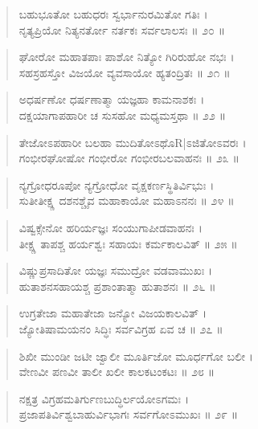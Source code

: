 \begin{verse}
ಬಹುಭೂತೋ ಬಹುಧರಃ ಸ್ವರ್ಭಾನುರಮಿತೋ ಗತಿಃ ।\\ನೃತ್ಯಪ್ರಿಯೋ ನಿತ್ಯನರ್ತೋ ನರ್ತಕಃ ಸರ್ವಲಾಲಸಃ \num{॥ ೨೦ ॥}
\end{verse}

\begin{verse}
ಘೋರೋ ಮಹಾತಪಾಃ ಪಾಶೋ ನಿತ್ಯೋ ಗಿರಿರುಹೋ ನಭಃ ।\\ಸಹಸ್ರಹಸ್ತೋ ವಿಜಯೋ ವ್ಯವಸಾಯೋ ಹ್ಯತಂದ್ರಿತಃ \num{॥ ೨೧ ॥}
\end{verse}

\begin{verse}
ಅಧರ್ಷಣೋ ಧರ್ಷಣಾತ್ಮಾ ಯಜ್ಞಹಾ ಕಾಮನಾಶಕಃ ।\\ದಕ್ಷಯಾಗಾಪಹಾರೀ ಚ ಸುಸಹೋ ಮಧ್ಯಮಸ್ತಥಾ \num{॥ ೨೨ ॥}
\end{verse}

\begin{verse}
ತೇಜೋಽಪಹಾರೀ ಬಲಹಾ ಮುದಿತೋಽಥೊR|ಽಜಿತೋಽವರಃ ।\\ಗಂಭೀರಘೋಷೋ ಗಂಭೀರೋ ಗಂಭೀರಬಲವಾಹನಃ \num{॥ ೨೩ ॥}
\end{verse}

\begin{verse}
ನ್ಯಗ್ರೋಧರೂಪೋ ನ್ಯಗ್ರೋಧೋ ವೃಕ್ಷಕರ್ಣಸ್ಥಿತಿರ್ವಿಭುಃ ।\\ಸುತೀತೀಕ್ಷ್ಣ ದಶನಶ್ಚೈವ ಮಹಾಕಾಯೋ ಮಹಾಽನನಃ \num{॥ ೨೪ ॥}
\end{verse}

\begin{verse}
ವಿಷ್ವಕ್ಸೇನೋ ಹರಿರ್ಯಜ್ಞಃ ಸಂಯುಗಾಪೀಡವಾಹನಃ ।\\ತೀಕ್ಷ್ಣ ತಾಪಶ್ಚ ಹರ್ಯಶ್ವಃ ಸಹಾಯಃ ಕರ್ಮಕಾಲವಿತ್ \num{॥ ೨೫ ॥}
\end{verse}

\begin{verse}
ವಿಷ್ಣುಪ್ರಸಾದಿತೋ ಯಜ್ಞಃ ಸಮುದ್ರೋ ವಡವಾಮುಖಃ ।\\ಹುತಾಶನಸಹಾಯಶ್ಚ ಪ್ರಶಾಂತಾತ್ಮಾ ಹುತಾಶನಃ \num{॥ ೨೬ ॥}
\end{verse}

\begin{verse}
ಉಗ್ರತೇಜಾ ಮಹಾತೇಜಾ ಜನ್ಯೋ ವಿಜಯಕಾಲವಿತ್ ।\\ಜ್ಯೋತಿಷಾಮಯನಂ ಸಿದ್ಧಿಃ ಸರ್ವವಿಗ್ರಹ ಏವ ಚ \num{॥ ೨೭ ॥}
\end{verse}

\begin{verse}
ಶಿಖೀ ಮುಂಡೀ ಜಟೀ ಜ್ವಾಲೀ ಮೂರ್ತಿಜೋ ಮೂರ್ಧಗೋ ಬಲೀ ।\\ವೇಣವೀ ಪಣವೀ ತಾಲೀ ಖಲೀ ಕಾಲಕಟಂಕಟಃ \num{॥ ೨೮ ॥}
\end{verse}

\begin{verse}
ನಕ್ಷತ್ರ ವಿಗ್ರಹಮತಿರ್ಗುಣಬುದ್ಧಿರ್ಲಯೋಽಗಮಃ ।\\ಪ್ರಜಾಪತಿರ್ವಿಶ್ವಬಾಹುರ್ವಿಭಾಗಃ ಸರ್ವಗೋಽಮುಖಃ \num{॥ ೨೯ ॥}
\end{verse}

